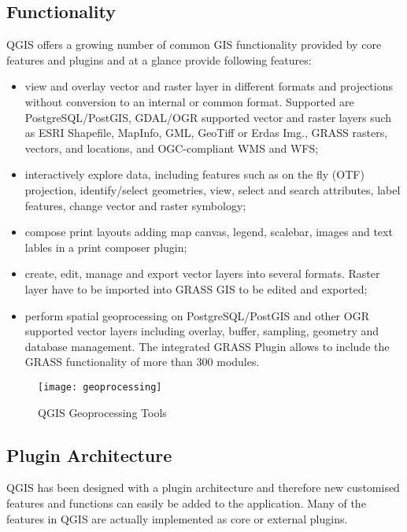 \subsection{Functionality}

QGIS offers a growing number of common GIS functionality provided by core
features and plugins and at a glance provide following features: 

\begin{itemize}
\item view and overlay vector and raster layer in different formats and
projections without conversion to an internal or common format. Supported are
PostgreSQL/PostGIS, GDAL/OGR supported vector and raster layers such as ESRI
Shapefile, MapInfo, GML, GeoTiff or Erdas Img., GRASS rasters, vectors, and locations, and
OGC-compliant WMS and WFS;
\item interactively explore data, including features such as on the fly
(OTF) projection, identify/select geometries, view, select and search
attributes, label features, change vector and raster symbology; 
\item compose print layouts adding map canvas, legend, scalebar, images and
text lables in a print composer plugin;
\item create, edit, manage and export vector layers into several formats.
Raster layer have to be imported into GRASS GIS to be edited and
exported;
\item perform spatial geoprocessing on PostgreSQL/PostGIS and other OGR
supported vector layers including overlay, buffer, sampling, geometry and
database management. The integrated GRASS Plugin allows to include the GRASS functionality of more than 300 modules.
\end{itemize}

\begin{figure}[h]
   \begin{center}
   \caption{QGIS Geoprocessing Tools}
    \label{fig:geoprocessing}\smallskip
   \texttt{[image: geoprocessing]}
\end{center}
\end{figure}

\subsection{Plugin Architecture}

QGIS has been designed with a plugin architecture and therefore new
customised features and functions can easily be added to the application.
Many of the features in QGIS are actually implemented as core or external
plugins. 

